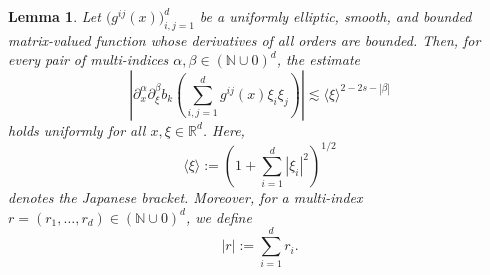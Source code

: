 \documentclass[10pt,a4paper]{amsart}
\newtheorem{lem}{Lemma}
\begin{document}
	\begin{lem}\label{towards functional calculus}
		Let $\bigl(g^{ij}(x)\bigr)_{i,j=1}^{d}$ be a uniformly elliptic, smooth, and bounded matrix-valued function whose derivatives of all orders are bounded. Then, for every pair of multi-indices $\alpha,\beta\in (\mathbb{N}\cup{0})^{d}$, the estimate
		\[
		\left|\partial_x^{\alpha}\partial_{\xi}^{\beta} b_k\left(\sum_{i,j=1}^d g^{ij}(x)\xi_i\xi_j\right)\right|
		\lesssim
		\langle \xi\rangle^{2-2s-|\beta|}
		\]
		holds uniformly for all $x,\xi\in\mathbb{R}^{d}$. Here,
		\[
		\langle \xi\rangle
		:=
		\left(1+\sum_{i=1}^{d}|\xi_i|^2\right)^{1/2}
		\]
		denotes the Japanese bracket. Moreover, for a multi-index
		$r=(r_1,\ldots,r_d)\in(\mathbb{N}\cup{0})^d$,
		we define
		\[
		|r|:=\sum_{i=1}^{d} r_i.
		\]
	\end{lem}
\end{document}
